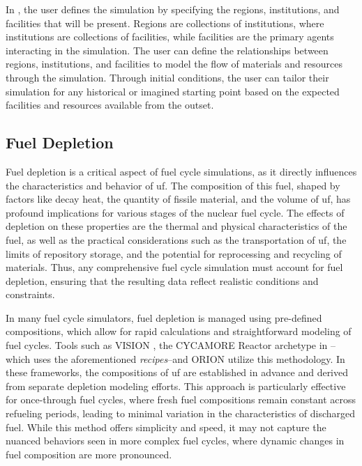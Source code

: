
In \cyclus, the user defines the simulation by specifying the regions,
institutions, and facilities that will be present. Regions
are collections of institutions, where institutions are collections of
facilities, while facilities are the primary agents interacting in the
simulation. The user can define the relationships between regions,
institutions, and facilities to model the flow of materials and resources
through the simulation. Through initial conditions, the user can tailor their
simulation for any historical or imagined starting point based on the expected
facilities and resources available from the outset.

\subsection{Fuel Depletion}
\label{sec:depletion}

Fuel depletion is a critical aspect of fuel cycle simulations, as it directly
influences the characteristics and behavior of \gls{uf}. The composition of
this fuel, shaped by factors like decay heat, the quantity of fissile material,
and the volume of \gls{uf}, has profound implications for various stages of the
nuclear fuel cycle. The effects of depletion on these properties are the
thermal and physical characteristics of the fuel, as well as the practical
considerations such as the transportation of \gls{uf}, the limits of repository
storage, and the potential for reprocessing and recycling of materials. Thus,
any comprehensive fuel cycle simulation must account for fuel depletion,
ensuring that the resulting data reflect realistic conditions and constraints.

In many fuel cycle simulators, fuel depletion is managed using pre-defined
compositions, which allow for rapid calculations and straightforward modeling
of fuel cycles. Tools such as VISION \cite{yacout_visionverifiable_2006}, the
CYCAMORE Reactor archetype in \cyclus--which uses the aforementioned
\textit{recipes}--and ORION utilize this methodology. In these frameworks, the
compositions of \gls{uf} are established in advance and derived from
separate depletion modeling efforts. This approach is particularly effective
for once-through fuel cycles, where fresh fuel compositions remain constant
across refueling periods, leading to minimal variation in the characteristics
of discharged fuel. While this method offers simplicity and speed, it may not
capture the nuanced behaviors seen in more complex fuel cycles, where dynamic
changes in fuel composition are more pronounced.

